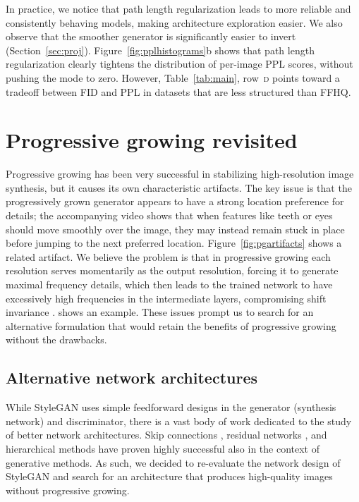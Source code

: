 \documentclass[10pt,twocolumn,letterpaper]{article}
\newcommand{\arch}[1]{\textsc{#1}}
\newcommand{\FINAL}[2][]{#2} %
\begin{document}
In practice, we notice that path length regularization leads to more reliable and consistently behaving models, making architecture exploration easier.
\FINAL{We also observe that the smoother generator is significantly easier to invert (Section~\ref{sec:proj}).}
Figure~\ref{fig:pplhistograms}b shows that path length regularization clearly tightens the distribution of per-image PPL \FINAL{scores, without pushing the mode to zero.}
\FINAL{However, Table~\ref{tab:main}, row~\arch{d} points toward a tradeoff between FID and PPL in datasets that are less structured than \textsc{FFHQ}.}

\section{Progressive growing revisited}
\label{sec:growing}

\figpgartifacts %

Progressive growing \cite{Karras2017} has been very successful in stabilizing high-resolution image synthesis, but it causes its own characteristic artifacts. 
The key issue is that the progressively grown generator appears to have a strong location preference for details; 
the accompanying video shows that when features like teeth or eyes should move smoothly over the image, they may instead remain stuck in place before jumping to the next preferred location. 
Figure~\ref{fig:pgartifacts} shows a related artifact. 
We believe the problem is that in progressive growing each resolution serves momentarily as the output resolution, forcing it to generate maximal frequency details, which then leads to the trained network to have excessively high frequencies in the intermediate layers, compromising shift invariance \cite{zhang2019}.  shows an example.
These issues prompt us to search for an alternative formulation that would retain the benefits of progressive growing without the drawbacks.

\subsection{Alternative network architectures}
\label{sec:altarch}

\figGDarch %

While StyleGAN uses simple feedforward designs in the generator (synthesis network) and discriminator, there is a vast body of work dedicated to the study of better network architectures.
Skip connections \cite{Ronneberger2015,Karnewar2019}, residual networks \cite{He2015b,Gulrajani2017,Miyato2018B}, and hierarchical methods \cite{Denton2015,Zhang2016,Zhang2017} have proven highly successful also in the context of generative methods.
As such, we decided to re-evaluate the network design of StyleGAN and search for an architecture that produces high-quality images without progressive growing.
\end{document}
